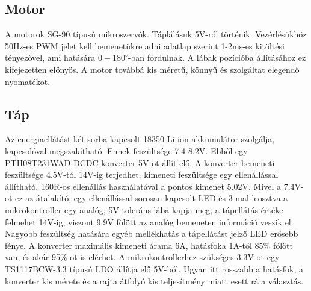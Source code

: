 \documentclass{article}
\begin{document}
\subsection{Motor}
A motorok SG-90 típusú mikroszervók. Táplálásuk 5V-ról történik. Vezérlésükhöz 50Hz-es PWM jelet kell bemenetükre adni adatlap szerint 1-2ms-es kitöltési tényezővel, ami hatására $0-180^{\circ}$-ban fordulnak. A lábak pozícióba állításához ez kifejezetten előnyös. A motor továbbá kis méretű, könnyű és szolgáltat elegendő nyomatékot.
\subsection{Táp}
Az energiaellátást két sorba kapcsolt 18350 Li-ion akkumulátor szolgálja, kapcsolóval megszakítható. Ennek feszültsége 7.4-8.2V.
Ebből egy PTH08T231WAD DCDC konverter 5V-ot állít elő. A konverter bemeneti feszültsége 4.5V-tól 14V-ig terjedhet, kimeneti feszültsége egy ellenállással állítható. 160R-os ellenállás használatával a pontos kimenet 5.02V. Mivel a 7.4V-ot ez az átalakító, egy ellenállással sorosan kapcsolt LED és 3-mal leosztva a mikrokontroller egy analóg, 5V toleráns lába kapja meg, a tápellátás értéke felmehet 14V-ig, viszont 9.9V fölött az analóg bemeneten információ veszik el. Nagyobb feszültség hatására egyéb mellékhatás a tápellátást jelző LED erősebb fénye. A konverter maximális kimeneti árama 6A, hatásfoka 1A-től 85\% fölött van, és akár 95\%-ot is elérhet.
A mikrokontrollerhez szükséges 3.3V-ot egy TS1117BCW-3.3 típusú LDO állítja elő 5V-ból. Ugyan itt rosszabb a hatásfok, a konverter kis mérete és a rajta átfolyó kis teljesítmény miatt esett rá a választás.
\end{document}
